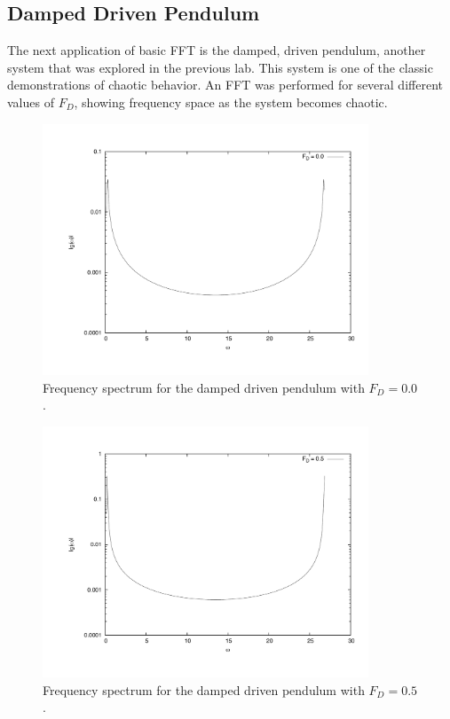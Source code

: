 \documentclass[12pt]{article}
\begin{document}
\subsection{Damped Driven Pendulum}
The next application of basic FFT is the damped, driven pendulum, another system that was explored in the previous lab.  This system is one of the classic demonstrations of chaotic behavior.  An FFT was performed for several different values of $F_D$, showing frequency space as the system becomes chaotic.  
\begin{figure}[!h]
\centering
\includegraphics[width =120 mm, height = 75mm]{ddp_0.pdf}
\caption{Frequency spectrum for the damped driven pendulum with $F_D = 0.0$.}
\label{fig:0}
\end{figure}
\begin{figure}[!h]
\centering
\includegraphics[width =120 mm, height = 75mm]{ddp_5.pdf}
\caption{Frequency spectrum for the damped driven pendulum with $F_D = 0.5$.}
\label{fig:5}
\end{figure}
\end{document}
